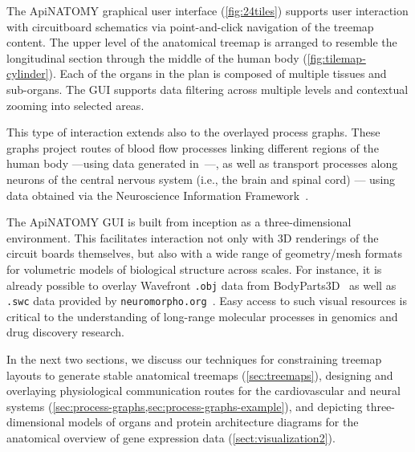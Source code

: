 The ApiNATOMY graphical user interface (\cref{fig:24tiles}) supports user interaction with
circuitboard schematics via point-and-click navigation of the treemap content. The upper level of
the anatomical treemap is arranged to resemble the longitudinal section through the middle of the
human body (\cref{fig:tilemap-cylinder}). Each of the organs in the plan is composed of multiple
tissues and sub-organs. The GUI supports data filtering across multiple levels and contextual
zooming into selected areas.

This type of interaction extends also to the overlayed process graphs. These graphs project routes
of blood flow processes linking different regions of the human body ---using data generated
in~\cite{deB11}---, as well as transport processes along neurons of the central nervous system
(i.e., the brain and spinal cord) --- using data obtained via the Neuroscience Information
Framework~\cite{Gar+08}.

The ApiNATOMY GUI is built from inception as a three-dimensional environment. This facilitates
interaction not only with 3D renderings of the circuit boards themselves, but also with a wide range
of geometry/mesh formats for volumetric models of biological structure across scales. For instance,
it is already possible to overlay Wavefront \texttt{.obj} data from BodyParts3D~\cite{MFT+09} as
well as \texttt{.swc} data provided by \texttt{neuromorpho.org}~\cite{Asc06}. Easy access to such
visual resources is critical to the understanding of long-range molecular processes in genomics and
drug discovery research.

In the next two sections, we discuss our techniques for
constraining treemap layouts to generate stable anatomical treemaps (\cref{sec:treemaps}),
designing and overlaying physiological communication routes for the cardiovascular and
	neural systems (\cref{sec:process-graphs,sec:process-graphs-example}), and
depicting three-dimensional models of organs and protein architecture diagrams for the anatomical
	overview of gene expression data (\cref{sect:visualization2}).




